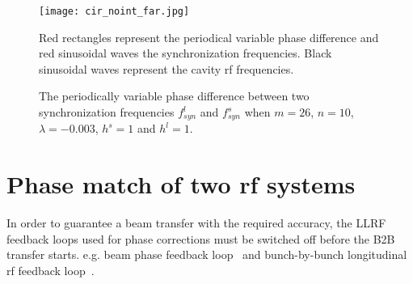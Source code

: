 \begin{figure}[!htb]
   \centering   
   \texttt{[image: cir\_noint\_far.jpg]}
   \caption{The periodically variable phase difference between two synchronization frequencies $f_{\mathit{syn}}^{l}$ and $f_{\mathit{syn}}^{s}$ when $m=26$, $n=10$, $\lambda=-0.003$, $h^s=1$ and $h^l=1$.}{Red rectangles represent the periodical variable phase difference and red sinusoidal waves the synchronization frequencies. Black sinusoidal waves represent the cavity rf frequencies.}
   \label{cir_noint_far}
\end{figure} 





%

  
\section{Phase match of two rf systems}
\label{two_sync_methods}
In order to guarantee a beam transfer with the required accuracy, the LLRF feedback loops used for phase corrections must be switched off before the B2B transfer starts. e.g. beam phase feedback loop~\cite{grieser_beam_2015} and bunch-by-bunch longitudinal rf feedback loop~\cite{gross_bunch-by-bunch_2015}.


